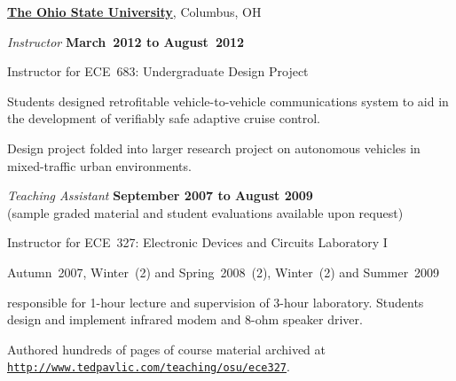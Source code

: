 \documentclass{article}
\providecommand*\url[1]{\href{#1}{#1}}
\renewcommand*\url[1]{\href{#1}{\texttt{#1}}}
\begin{document}
\href{http://www.osu.edu}{\textbf{The Ohio State University}},
Columbus, OH
\begin{outerlist}

\item[] \textit{Instructor}%
    \hfill \textbf{March~2012 to August~2012}
    \begin{innerlist}
        \item Instructor for ECE~683: Undergraduate Design Project
            \begin{innerlist}
                \item Students designed retrofitable vehicle-to-vehicle
                    communications system to aid in the development of
                    verifiably safe adaptive cruise control.
                \item Design project folded into larger research project
                    on autonomous vehicles in mixed-traffic urban
                    environments.
            \end{innerlist}
    \end{innerlist}

\item[] \textit{Teaching Assistant}%
    \hfill \textbf{September 2007 to August 2009}\\
    (sample graded material and student evaluations available upon
    request)
    \begin{innerlist}
        \item Instructor for ECE~327: Electronic Devices and Circuits Laboratory I
        \begin{innerlist}
            \item Autumn~2007, Winter~(2) and Spring~2008~(2),
                Winter~(2) and Summer~2009


            \item responsible for 1-hour lecture and supervision of
                3-hour laboratory. Students design and implement
                infrared modem and 8-ohm speaker driver.

            \item Authored hundreds of pages of course material
                archived at\\
                \url{http://www.tedpavlic.com/teaching/osu/ece327}.
        \end{innerlist}


\end{innerlist}
\end{outerlist}
\end{document}
